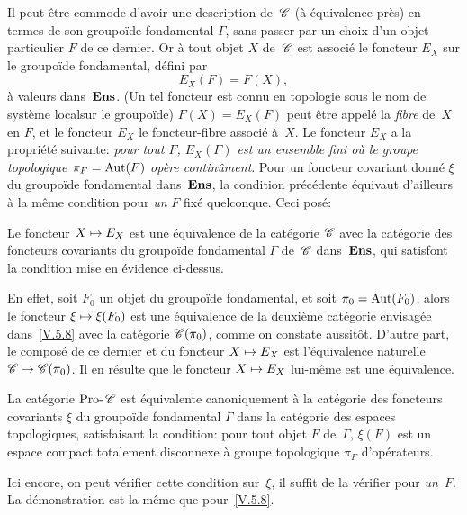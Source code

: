 Il peut \^etre commode d'avoir une description de~$\cal{C}$ (\`a
\'equivalence pr\`es) en termes de son groupo\"ide fondamental
$\Gamma$, sans passer par un choix d'un objet particulier $F$ de ce
dernier. Or \`a tout objet $X$ de~$\cal{C}$ est associ\'e le
foncteur $E_X$ sur le groupo\"ide fondamental, d\'efini par
$$
E_X(F)=F(X),
$$
\`a valeurs dans~$\mathbf{Ens}$. (Un tel foncteur est connu en topologie
sous le nom de \og syst\`eme local\fg sur le groupo\"ide)
$F(X)=E_X(F)$ peut \^etre appel\'e la \emph{fibre} de~$X$ en $F$,
et le foncteur $E_X$ le foncteur-fibre associ\'e \`a~$X$. Le
foncteur $E_X$ a la propri\'et\'e
suivante:
\emph{pour tout $F$, $E_X(F)$ est un ensemble fini
où le groupe topologique $\pi_F=\operatorname{Aut}(F)$ opère continûment}.
Pour un
foncteur covariant donn\'e $\xi$ du groupo\"ide fondamental
dans~$\mathbf{Ens}$, la condition pr\'ec\'edente \'equivaut d'ailleurs
\`a la m\^eme condition pour \emph{un} $F$ fix\'e
quelconque. Ceci pos\'e:

\begin{proposition}
\label{V.5.8}
Le foncteur $X\mto E_X$ est une \'equivalence de la cat\'egorie
$\cal{C}$ avec la cat\'egorie des foncteurs covariants du
groupo\"ide fondamental $\Gamma$ de~$\cal{C}$ dans~$\mathbf{Ens}$, qui
satisfont la condition
mise en \'evidence ci-dessus.
\end{proposition}

En effet, soit $F_0$ un objet du groupo\"ide fondamental, et soit
$\pi_0=\operatorname{Aut}(F_0)$, alors le foncteur $\xi\mto \xi(F_0)$ est une
\'equivalence de la deuxi\`eme cat\'egorie envisag\'ee
dans~\ref{V.5.8} avec la cat\'egorie $\cal{C}(\pi_0)$, comme on
constate aussit\^ot. D'autre part, le compos\'e de ce dernier et
du foncteur $X\mto E_X$ est l'\'equivalence naturelle
$\cal{C}\to\cal{C}(\pi_0)$. Il en r\'esulte que le foncteur
$X\mto E_X$ lui-m\^eme est une \'equivalence.

\begin{corollaire}
\label{V.5.9}
La cat\'egorie $\Prodash\cal{C}$
est \'equivalente canoniquement \`a la cat\'egorie des foncteurs
covariants $\xi$ du groupo\"ide fondamental $\Gamma$ dans la
cat\'egorie des espaces topologiques, satisfaisant la condition:
pour tout objet $F$ de~$\Gamma$, $\xi(F)$ est un espace compact
totalement disconnexe \`a groupe topologique $\pi_F$
d'op\'erateurs.
\end{corollaire}

Ici encore, on peut v\'erifier cette condition sur~$\xi$, il suffit
de la v\'erifier pour \emph{un}~$F$. La d\'emonstration est la
m\^eme que pour~\ref{V.5.8}.

